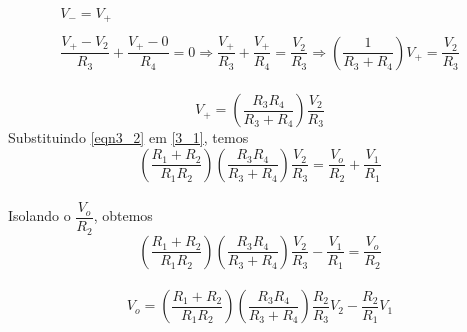	\begin{gather*}
		V_-=V_+
		\\
		\\
		\dfrac{V_+ -V_2}{R_3}+\dfrac{V_+ - 0}{R_4} = 0
        \Longrightarrow
		\dfrac{V_+}{R_3} + \dfrac{V_+}{R_4} = \dfrac{V_2}{R_3}
		\Longrightarrow
		\left(\dfrac{1}{R_3 + R_4}\right) V_+ = \dfrac{V_2}{R_3}
	\end{gather*}
	\\
	\begin{equation}\label{eqn3_2}
		V_+ = \left(\dfrac{R_3 R_4}{R_3 + R_4}\right) \dfrac{V_2}{R_3}
	\end{equation}
	Substituindo \ref{eqn3_2} em \ref{3_1}, temos
	\\
	\begin{equation*}
	\left(\dfrac{R_1+R_2}{R_1 R_2}\right)\left(\dfrac{R_3 R_4}{R_3 + R_4}\right)\dfrac{V_2}{R_3} = \dfrac{V_o}{R_2} + \dfrac{V_1}{R_1}
	\end{equation*}
	\\
	Isolando o $\dfrac{V_o}{R_2}$, obtemos
	\\
	\begin{equation*}
		\left(\dfrac{R_1+R_2}{R_1 R_2}\right)\left(\dfrac{R_3 R_4}{R_3 + R_4}\right)\dfrac{V_2}{R_3} - \dfrac{V_1}{R_1} = \dfrac{V_o}{R_2}
	\end{equation*}
	\\
	\begin{equation}
		V_o = \left(\dfrac{R_1+R_2}{R_1 R_2}\right)\left(\dfrac{R_3 R_4}{R_3 + R_4}\right)\dfrac{R_2}{R_3} V_2 - \dfrac{R_2}{R_1}V_1
	\end{equation}
	
